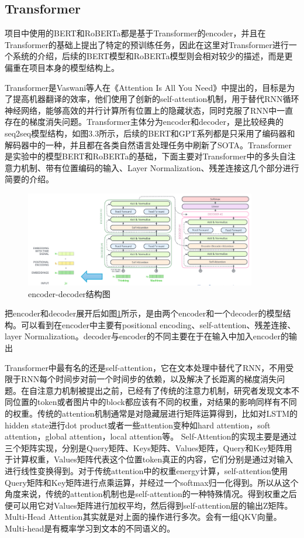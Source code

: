 \documentclass[a4paper, 12pt]{article}
\begin{document}

\subsection{Transformer}
\label{sub:transformer}
项目中使用的BERT和RoBERTa都是基于Transformer的encoder，并且在Transformer的基础上提出了特定的预训练任务，因此在这里对Transformer进行一个系统的介绍，后续的BERT模型和RoBERTa模型则会相对较少的描述，而是更偏重在项目本身的模型结构上。


Transformer是Vaswani等人在《Attention Is All You Need》中提出的，目标是为了提高机器翻译的效率，他们使用了创新的self-attention机制，用于替代RNN循环神经网络，能够高效的并行计算所有位置上的隐藏状态，同时克服了RNN中一直存在的梯度消失问题\cite{NIPS2017_3f5ee243}。Transformer主体分为encoder和decoder，是比较经典的seq2seq模型结构，如图3.3所示，后续的BERT和GPT系列都是只采用了编码器和解码器中的一种，并且都在各类自然语言处理任务中刷新了SOTA。Transformer是实验中的模型BERT和RoBERTa的基础，下面主要对Transformer中的多头自注意力机制、带有位置编码的输入、Layer Normalization、残差连接这几个部分进行简要的介绍。

\begin{figure}[htbp]
    \centering
    \includegraphics[width=0.9\textwidth]{encoder-decoder}
    \caption{encoder-decoder结构图}
    \label{fig:encoder}
\end{figure}


把encoder和decoder展开后如图\ref{fig:encoder}所示，是由两个encoder和一个decoder的模型结构。可以看到在encoder中主要有positional encoding、self-attention、残差连接、layer Normalization。decoder与encoder的不同主要在于在输入中加入encoder的输出

Transformer中最有名的还是self-attention，它在文本处理中替代了RNN，不用受限于RNN每个时间步对前一个时间步的依赖，以及解决了长距离的梯度消失问题。在自注意力机制被提出之前，已经有了传统的注意力机制，研究者发现文本不同位置的token或者图片中的block都应该有不同的权重，对结果的影响同样有不同的权重。传统的attention机制通常是对隐藏层进行矩阵运算得到，比如对LSTM的hidden state进行dot product或者一些attention变种如hard attention，soft attention，global attention，local attention等。
Self-Attention的实现主要是通过三个矩阵实现，分别是Query矩阵、Keys矩阵、Values矩阵，Query和Key矩阵用于计算权重，Values矩阵代表这个位置token真正的内容，它们分别是通过对输入进行线性变换得到。对于传统attention中的权重energy计算，self-attention使用Query矩阵和Key矩阵进行点乘运算，并经过一个softmax归一化得到。所以从这个角度来说，传统的attention机制也是self-attention的一种特殊情况。得到权重之后便可以用它对Values矩阵进行加权平均，然后得到self-attention层的输出Z矩阵。
Multi-Head Attention其实就是对上面的操作进行多次。会有一组QKV向量。Multi-head是有概率学习到文本的不同语义的。
\end{document}

